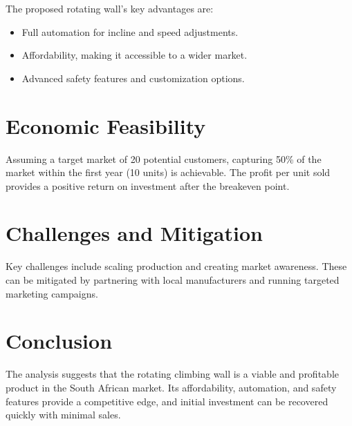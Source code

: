 The proposed rotating wall's key advantages are:
\begin{itemize}
    \item Full automation for incline and speed adjustments.
    \item Affordability, making it accessible to a wider market.
    \item Advanced safety features and customization options.
\end{itemize}

\section{Economic Feasibility}

Assuming a target market of 20 potential customers, capturing 50\% of the market within the first year (10 units) is achievable. The profit per unit sold provides a positive return on investment after the breakeven point.

\section{Challenges and Mitigation}

Key challenges include scaling production and creating market awareness. These can be mitigated by partnering with local manufacturers and running targeted marketing campaigns.

\section{Conclusion}

The analysis suggests that the rotating climbing wall is a viable and profitable product in the South African market. Its affordability, automation, and safety features provide a competitive edge, and initial investment can be recovered quickly with minimal sales.
